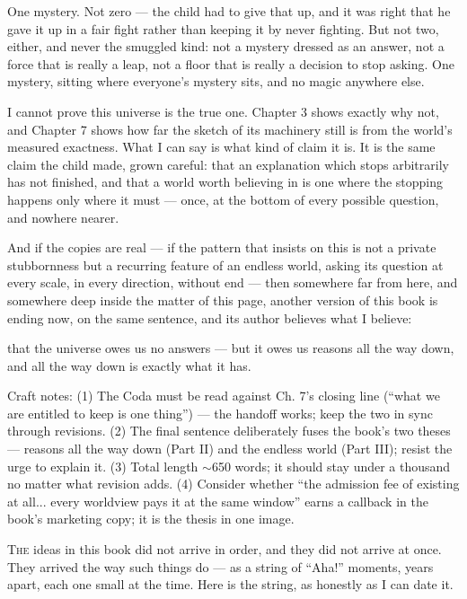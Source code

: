 \documentclass[fontsize=11pt,paper=a4,pagesize=auto,parskip=half-]{scrbook}
\newcommand\En{\centerline{\textemdash \qquad \ding{166} \qquad \textemdash}}
\newif\ifdraftnotes
\newenvironment{draftnote}{%
  \ifdraftnotes\par\small\itshape\color{black!60}\noindent[Craft notes: \ignorespaces
  \else\setbox0\vbox\bgroup\fi}{%
  \ifdraftnotes]\par\normalcolor\normalsize
  \else\egroup\fi}
\newcommand{\draftstatus}[1]{\ifdraftnotes{\small\itshape\color{black!60}#1\par}\fi\medskip}
\begin{document}
One mystery. Not zero --- the child had to give that up, and it was right that he gave it up in a fair fight rather than keeping it by never fighting. But not two, either, and never the smuggled kind: not a mystery dressed as an answer, not a force that is really a leap, not a floor that is really a decision to stop asking. One mystery, sitting where everyone's mystery sits, and no magic anywhere else.

I cannot prove this universe is the true one. Chapter 3 shows exactly why not, and Chapter 7 shows how far the sketch of its machinery still is from the world's measured exactness. What I can say is what kind of claim it is. It is the same claim the child made, grown careful: that an explanation which stops arbitrarily has not finished, and that a world worth believing in is one where the stopping happens only where it must --- once, at the bottom of every possible question, and nowhere nearer.

And if the copies are real --- if the pattern that insists on this is not a private stubbornness but a recurring feature of an endless world, asking its question at every scale, in every direction, without end --- then somewhere far from here, and somewhere deep inside the matter of this page, another version of this book is ending now, on the same sentence, and its author believes what I believe:

that the universe owes us no answers --- but it owes us reasons all the way down, and all the way down is exactly what it has.

\En

\begin{draftnote}
Craft notes: (1) The Coda must be read against Ch. 7's closing line (``what we are entitled to keep is one thing'') --- the handoff works; keep the two in sync through revisions. (2) The final sentence deliberately fuses the book's two theses --- reasons all the way down (Part II) and the endless world (Part III); resist the urge to explain it. (3) Total length $\sim$650 words; it should stay under a thousand no matter what revision adds. (4) Consider whether ``the admission fee of existing at all... every worldview pays it at the same window'' earns a callback in the book's marketing copy; it is the thesis in one image.
\end{draftnote}

\draftstatus{Draft 1}

\lettrine{T}{he} ideas in this book did not arrive in order, and they did not arrive at once. They arrived the way such things do --- as a string of ``Aha!'' moments, years apart, each one small at the time. Here is the string, as honestly as I can date it.
\end{document}
